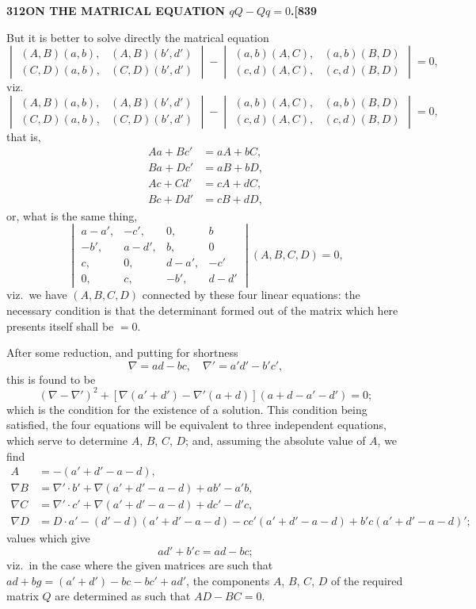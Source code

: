 \documentclass[11pt,a4paper]{book}
\begin{document}
\newpage
\setcounter{page}{312}

\noindent\textbf{312}\hfill\textbf{ON THE MATRICAL EQUATION $qQ - Qq = 0$.}\hfill\textbf{[839}

\bigskip

\noindent But it is better to solve directly the matrical equation
\[
\begin{vmatrix} (A, B)(a, b), & (A, B)(b', d') \\ (C, D)(a, b), & (C, D)(b', d') \end{vmatrix} - \begin{vmatrix} (a, b)(A, C), & (a, b)(B, D) \\ (c, d)(A, C), & (c, d)(B, D) \end{vmatrix} = 0,
\]
viz.\
\[
\begin{vmatrix} (A, B)(a, b), & (A, B)(b', d') \\ (C, D)(a, b), & (C, D)(b', d') \end{vmatrix} - \begin{vmatrix} (a, b)(A, C), & (a, b)(B, D) \\ (c, d)(A, C), & (c, d)(B, D) \end{vmatrix} = 0,
\]
that is,
\begin{align*}
Aa + Bc' &= aA + bC, \\
Ba + Dc' &= aB + bD, \\
Ac + Cd' &= cA + dC, \\
Bc + Dd' &= cB + dD,
\end{align*}
or, what is the same thing,
\[
\begin{vmatrix} a - a', & -c', & 0, & b \\ -b', & a - d', & b, & 0 \\ c, & 0, & d - a', & -c' \\ 0, & c, & -b', & d - d' \end{vmatrix} (A, B, C, D) = 0,
\]
viz.\ we have $(A, B, C, D)$ connected by these four linear equations: the necessary condition is that the determinant formed out of the matrix which here presents itself shall be $= 0$.

After some reduction, and putting for shortness
\[
\nabla = ad - bc, \quad \nabla' = a'd' - b'c',
\]
this is found to be
\[
(\nabla - \nabla')^2 + [\nabla(a' + d') - \nabla'(a + d)](a + d - a' - d') = 0;
\]
which is the condition for the existence of a solution. This condition being satisfied, the four equations will be equivalent to three independent equations, which serve to determine $A$, $B$, $C$, $D$; and, assuming the absolute value of $A$, we find
\begin{align*}
A &= -(a' + d' - a - d), \\
\nabla B &= \nabla' \cdot b' + \nabla(a' + d' - a - d) + ab' - a'b, \\
\nabla C &= \nabla' \cdot c' + \nabla(a' + d' - a - d) + dc' - d'c, \\
\nabla D &= D \cdot a' - (d' - d)(a' + d' - a - d) - cc'(a' + d' - a - d) + b'c(a' + d' - a - d)';
\end{align*}
values which give
\[
ad' + b'c = ad - bc;
\]
viz.\ in the case where the given matrices are such that $ad + bg = (a' + d') - bc - bc' + ad'$, the components $A$, $B$, $C$, $D$ of the required matrix $Q$ are determined as such that $AD - BC = 0$.
\end{document}

